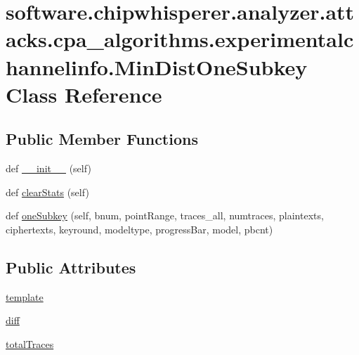 \hypertarget{classsoftware_1_1chipwhisperer_1_1analyzer_1_1attacks_1_1cpa__algorithms_1_1experimentalchannelinfo_1_1MinDistOneSubkey}{}\section{software.\+chipwhisperer.\+analyzer.\+attacks.\+cpa\+\_\+algorithms.\+experimentalchannelinfo.\+Min\+Dist\+One\+Subkey Class Reference}
\label{classsoftware_1_1chipwhisperer_1_1analyzer_1_1attacks_1_1cpa__algorithms_1_1experimentalchannelinfo_1_1MinDistOneSubkey}
\subsection*{Public Member Functions}
\begin{DoxyCompactItemize}
\item 
def \hyperlink{classsoftware_1_1chipwhisperer_1_1analyzer_1_1attacks_1_1cpa__algorithms_1_1experimentalchannelinfo_1_1MinDistOneSubkey_aeba74716a0b22dffeaed85cea4340d20}{\+\_\+\+\_\+init\+\_\+\+\_\+} (self)
\item 
def \hyperlink{classsoftware_1_1chipwhisperer_1_1analyzer_1_1attacks_1_1cpa__algorithms_1_1experimentalchannelinfo_1_1MinDistOneSubkey_a46281813278b06581d11602fde763116}{clear\+Stats} (self)
\item 
def \hyperlink{classsoftware_1_1chipwhisperer_1_1analyzer_1_1attacks_1_1cpa__algorithms_1_1experimentalchannelinfo_1_1MinDistOneSubkey_ac37dae9e838fb5532a7f18be3c7fcfaf}{one\+Subkey} (self, bnum, point\+Range, traces\+\_\+all, numtraces, plaintexts, ciphertexts, keyround, modeltype, progress\+Bar, model, pbcnt)
\end{DoxyCompactItemize}
\subsection*{Public Attributes}
\begin{DoxyCompactItemize}
\item 
\hyperlink{classsoftware_1_1chipwhisperer_1_1analyzer_1_1attacks_1_1cpa__algorithms_1_1experimentalchannelinfo_1_1MinDistOneSubkey_a32436420d3e4d3bf68c485dfc14100f9}{template}
\item 
\hyperlink{classsoftware_1_1chipwhisperer_1_1analyzer_1_1attacks_1_1cpa__algorithms_1_1experimentalchannelinfo_1_1MinDistOneSubkey_afcce723f81b229edec5bd5057122bf86}{diff}
\item 
\hyperlink{classsoftware_1_1chipwhisperer_1_1analyzer_1_1attacks_1_1cpa__algorithms_1_1experimentalchannelinfo_1_1MinDistOneSubkey_abbc316bb21caa52a556a2bf1b7c82eca}{total\+Traces}
\end{DoxyCompactItemize}


